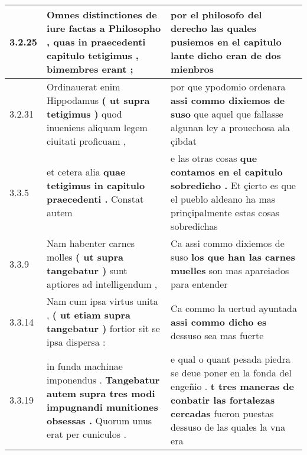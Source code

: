 \begin{tabular}{|p{1cm}|p{6.5cm}|p{6.5cm}|}
3.2.25 & Omnes distinctiones de iure factas a Philosopho , \textbf{ quas in praecedenti capitulo tetigimus , } bimembres erant ; & por el philosofo del derecho \textbf{ las quales pusiemos en el capitulo lante dicho } eran de dos mienbros \\\hline
3.2.31 & Ordinauerat enim Hippodamus \textbf{ ( ut supra tetigimus ) } quod inueniens aliquam legem ciuitati proficuam , & por que ypodomio ordenara \textbf{ assi commo dixiemos de suso } que aquel que fallasse algunan ley a prouechosa ala çibdat \\\hline
3.3.5 & et cetera alia \textbf{ quae tetigimus in capitulo praecedenti . } Constat autem & e las otras cosas \textbf{ que contamos en el capitulo sobredicho . } Et çierto es que el pueblo aldeano ha mas prinçipalmente estas cosas sobredichas \\\hline
3.3.9 & Nam habenter carnes molles \textbf{ ( ut supra tangebatur ) } sunt aptiores ad intelligendum , & Ca assi commo dixiemos de suso \textbf{ los que han las carnes muelles } son mas apareiados para entender \\\hline
3.3.14 & Nam cum ipsa virtus unita , \textbf{ ( ut etiam supra tangebatur ) } fortior sit se ipsa dispersa : & Ca commo la uertud ayuntada \textbf{ assi commo dicho es } dessuso sea mas fuerte \\\hline
3.3.19 & in funda machinae imponendus . \textbf{ Tangebatur autem supra tres modi impugnandi munitiones obsessas . } Quorum unus erat per cuniculos . & e qual o quant pesada piedra se deue poner en la fonda del engeñio . \textbf{ t tres maneras de conbatir las fortalezas cercadas } fueron puestas dessuso de las quales la vna era \\\hline

\end{tabular}
